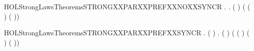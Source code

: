 \begin{SaveVerbatim}{HOLStrongLawsTheoremsSTRONGXXPARXXPREFXXNOXXSYNCR}
\HOLTokenTurnstile{} \HOLSymConst{\HOLTokenForall{}} .
        \HOLSymConst{\HOLTokenNotEqual{}}   \HOLSymConst{\HOLTokenImp{}}
       \HOLSymConst{\HOLTokenForall{}} .
            (  \HOLSymConst{\ensuremath{\parallel}}  )
             ( ( \HOLSymConst{\ensuremath{\parallel}}  ) \HOLSymConst{\ensuremath{+}}
               (  \HOLSymConst{\ensuremath{\parallel}} ))
\end{SaveVerbatim}
\newcommand{\HOLStrongLawsTheoremsSTRONGXXPARXXPREFXXNOXXSYNCR}{\UseVerbatim{HOLStrongLawsTheoremsSTRONGXXPARXXPREFXXNOXXSYNCR}}
\begin{SaveVerbatim}{HOLStrongLawsTheoremsSTRONGXXPARXXPREFXXSYNCR}
\HOLTokenTurnstile{} \HOLSymConst{\HOLTokenForall{}} .
       ( \HOLSymConst{=}  ) \HOLSymConst{\HOLTokenImp{}}
       \HOLSymConst{\HOLTokenForall{}} .
            (  \HOLSymConst{\ensuremath{\parallel}}  )
             ( ( \HOLSymConst{\ensuremath{\parallel}}  ) \HOLSymConst{\ensuremath{+}}
               (  \HOLSymConst{\ensuremath{\parallel}} ) \HOLSymConst{\ensuremath{+}} \HOLConst{\ensuremath{\tau}}( \HOLSymConst{\ensuremath{\parallel}} ))
\end{SaveVerbatim}
\newcommand{\HOLStrongLawsTheoremsSTRONGXXPARXXPREFXXSYNCR}{\UseVerbatim{HOLStrongLawsTheoremsSTRONGXXPARXXPREFXXSYNCR}}
